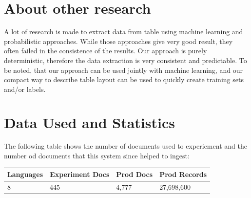 \documentclass{article}
\begin{document}
\section{About other research}
A lot of research is made to extract data from table using machine learning and probabilistic approaches. While those
approaches give very good result, they often failed in the consistence of the results. Our approach is purely
deterministic, therefore the data extraction is very consistent and predictable. To be noted, that our approach can be
used jointly with machine learning, and our compact way to describe table layout can be used to quickly create training
sets and/or labels.

\section{Data Used and Statistics}
The following table shows the number of documents used to experiement and the number od documents that this system since
helped to ingest:
\begin{table}[H]
\centering
\begin{tabular}{|l|l|l|l|}
\hline
Languages & Experiment Docs & Prod Docs  & Prod Records    \\
\hline
8         & 445             & 4,777      & 27,698,600 \\
\hline
\end{tabular}
\end{table}
\end{document}
